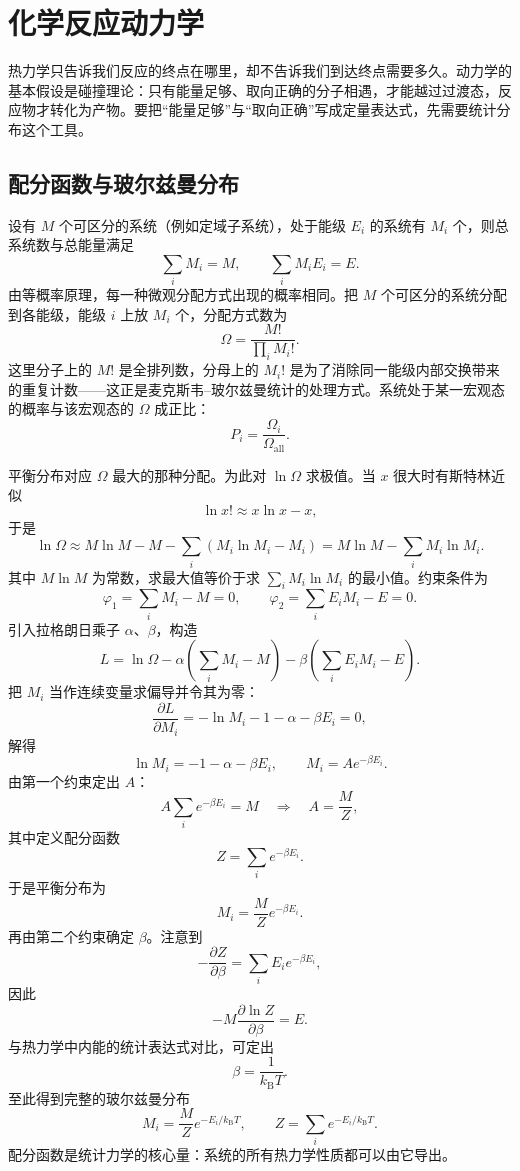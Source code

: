 \documentclass[UTF8]{ctexbook}
\begin{document}
\newpage
\section{化学反应动力学}

热力学只告诉我们反应的终点在哪里，却不告诉我们到达终点需要多久。动力学的基本假设是碰撞理论：只有能量足够、取向正确的分子相遇，才能越过过渡态，反应物才转化为产物。要把“能量足够”与“取向正确”写成定量表达式，先需要统计分布这个工具。

\subsection{配分函数与玻尔兹曼分布}

设有 $M$ 个可区分的系统（例如定域子系统），处于能级 $E_i$ 的系统有 $M_i$ 个，则总系统数与总能量满足
\[
\sum_i M_i=M,\qquad \sum_i M_iE_i=E .
\]
由等概率原理，每一种微观分配方式出现的概率相同。把 $M$ 个可区分的系统分配到各能级，能级 $i$ 上放 $M_i$ 个，分配方式数为
\[
\Omega=\frac{M!}{\prod_i M_i!}.
\]
这里分子上的 $M!$ 是全排列数，分母上的 $M_i!$ 是为了消除同一能级内部交换带来的重复计数——这正是麦克斯韦--玻尔兹曼统计的处理方式。系统处于某一宏观态的概率与该宏观态的 $\Omega$ 成正比：
\[
P_i=\frac{\Omega_i}{\Omega_{\mathrm{all}}}.
\]

平衡分布对应 $\Omega$ 最大的那种分配。为此对 $\ln\Omega$ 求极值。当 $x$ 很大时有斯特林近似
\[
\ln x!\approx x\ln x-x,
\]
于是
\[
\ln\Omega\approx M\ln M-M-\sum_i\left(M_i\ln M_i-M_i\right)
=M\ln M-\sum_i M_i\ln M_i .
\]
其中 $M\ln M$ 为常数，求最大值等价于求 $\sum_i M_i\ln M_i$ 的最小值。约束条件为
\[
\varphi_1=\sum_i M_i-M=0,\qquad
\varphi_2=\sum_i E_iM_i-E=0 .
\]
引入拉格朗日乘子 $\alpha$、$\beta$，构造
\[
L=\ln\Omega-\alpha\left(\sum_i M_i-M\right)
-\beta\left(\sum_i E_iM_i-E\right).
\]
把 $M_i$ 当作连续变量求偏导并令其为零：
\[
\frac{\partial L}{\partial M_i}
=-\ln M_i-1-\alpha-\beta E_i=0,
\]
解得
\[
\ln M_i=-1-\alpha-\beta E_i,
\qquad
M_i=Ae^{-\beta E_i}.
\]
由第一个约束定出 $A$：
\[
A\sum_i e^{-\beta E_i}=M
\quad\Longrightarrow\quad
A=\frac{M}{Z},
\]
其中定义配分函数
\[
Z=\sum_i e^{-\beta E_i}.
\]
于是平衡分布为
\[
M_i=\frac{M}{Z}e^{-\beta E_i}.
\]
再由第二个约束确定 $\beta$。注意到
\[
-\frac{\partial Z}{\partial\beta}=\sum_i E_i e^{-\beta E_i},
\]
因此
\[
-M\frac{\partial\ln Z}{\partial\beta}=E .
\]
与热力学中内能的统计表达式对比，可定出
\[
\beta=\frac{1}{k_{\mathrm B}T}.
\]
至此得到完整的玻尔兹曼分布
\[
M_i=\frac{M}{Z}e^{-E_i/k_{\mathrm B}T},
\qquad
Z=\sum_i e^{-E_i/k_{\mathrm B}T}.
\]
配分函数是统计力学的核心量：系统的所有热力学性质都可以由它导出。
\end{document}
